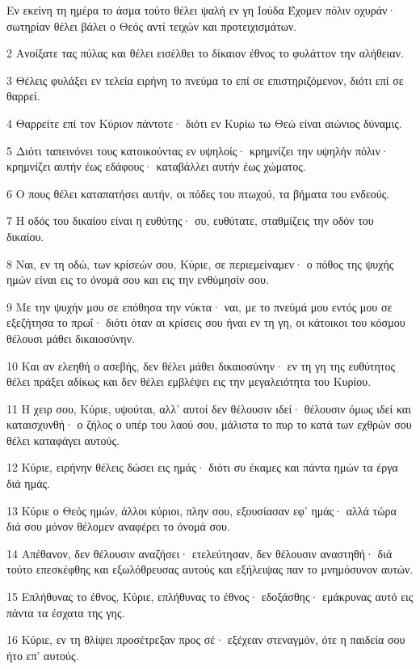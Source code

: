 \par Εν εκείνη τη ημέρα το άσμα τούτο θέλει ψαλή εν γη Ιούδα Έχομεν πόλιν οχυράν· σωτηρίαν θέλει βάλει ο Θεός αντί τειχών και προτειχισμάτων.
\par 2 Ανοίξατε τας πύλας και θέλει εισέλθει το δίκαιον έθνος το φυλάττον την αλήθειαν.
\par 3 Θέλεις φυλάξει εν τελεία ειρήνη το πνεύμα το επί σε επιστηριζόμενον, διότι επί σε θαρρεί.
\par 4 Θαρρείτε επί τον Κύριον πάντοτε· διότι εν Κυρίω τω Θεώ είναι αιώνιος δύναμις.
\par 5 Διότι ταπεινόνει τους κατοικούντας εν υψηλοίς· κρημνίζει την υψηλήν πόλιν· κρημνίζει αυτήν έως εδάφους· καταβάλλει αυτήν έως χώματος.
\par 6 Ο πους θέλει καταπατήσει αυτήν, οι πόδες του πτωχού, τα βήματα του ενδεούς.
\par 7 Η οδός του δικαίου είναι η ευθύτης· συ, ευθύτατε, σταθμίζεις την οδόν του δικαίου.
\par 8 Ναι, εν τη οδώ, των κρίσεών σου, Κύριε, σε περιεμείναμεν· ο πόθος της ψυχής ημών είναι εις το όνομά σου και εις την ενθύμησίν σου.
\par 9 Με την ψυχήν μου σε επόθησα την νύκτα· ναι, με το πνεύμά μου εντός μου σε εξεζήτησα το πρωΐ· διότι όταν αι κρίσεις σου ήναι εν τη γη, οι κάτοικοι του κόσμου θέλουσι μάθει δικαιοσύνην.
\par 10 Και αν ελεηθή ο ασεβής, δεν θέλει μάθει δικαιοσύνην· εν τη γη της ευθύτητος θέλει πράξει αδίκως και δεν θέλει εμβλέψει εις την μεγαλειότητα του Κυρίου.
\par 11 Η χειρ σου, Κύριε, υψούται, αλλ' αυτοί δεν θέλουσιν ιδεί· θέλουσιν όμως ιδεί και καταισχυνθή· ο ζήλος ο υπέρ του λαού σου, μάλιστα το πυρ το κατά των εχθρών σου θέλει καταφάγει αυτούς.
\par 12 Κύριε, ειρήνην θέλεις δώσει εις ημάς· διότι συ έκαμες και πάντα ημών τα έργα διά ημάς.
\par 13 Κύριε ο Θεός ημών, άλλοι κύριοι, πλην σου, εξουσίασαν εφ' ημάς· αλλά τώρα διά σου μόνον θέλομεν αναφέρει το όνομά σου.
\par 14 Απέθανον, δεν θέλουσιν αναζήσει· ετελεύτησαν, δεν θέλουσιν αναστηθή· διά τούτο επεσκέφθης και εξωλόθρευσας αυτούς και εξήλειψας παν το μνημόσυνον αυτών.
\par 15 Επλήθυνας το έθνος, Κύριε, επλήθυνας το έθνος· εδοξάσθης· εμάκρυνας αυτό εις πάντα τα έσχατα της γης.
\par 16 Κύριε, εν τη θλίψει προσέτρεξαν προς σέ· εξέχεαν στεναγμόν, ότε η παιδεία σου ήτο επ' αυτούς.
